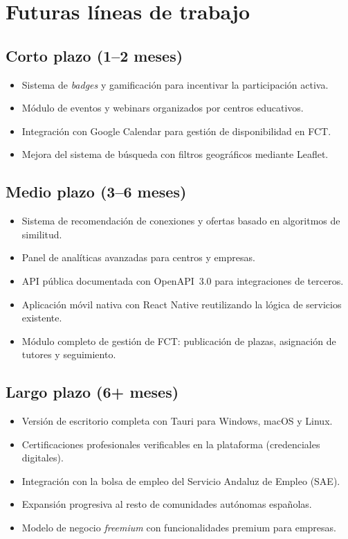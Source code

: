 \documentclass[a4paper]{report}
\begin{document}
\section{Futuras líneas de trabajo}

\subsection{Corto plazo (1--2 meses)}
\begin{itemize}
  \item Sistema de \textit{badges} y gamificación para incentivar la participación activa.
  \item Módulo de eventos y webinars organizados por centros educativos.
  \item Integración con Google Calendar para gestión de disponibilidad en FCT.
  \item Mejora del sistema de búsqueda con filtros geográficos mediante Leaflet.
\end{itemize}

\subsection{Medio plazo (3--6 meses)}
\begin{itemize}
  \item Sistema de recomendación de conexiones y ofertas basado en algoritmos de similitud.
  \item Panel de analíticas avanzadas para centros y empresas.
  \item API pública documentada con OpenAPI~3.0 para integraciones de terceros.
  \item Aplicación móvil nativa con React Native reutilizando la lógica de servicios existente.
  \item Módulo completo de gestión de FCT: publicación de plazas, asignación de tutores y seguimiento.
\end{itemize}

\subsection{Largo plazo (6+ meses)}
\begin{itemize}
  \item Versión de escritorio completa con Tauri para Windows, macOS y Linux.
  \item Certificaciones profesionales verificables en la plataforma (credenciales digitales).
  \item Integración con la bolsa de empleo del Servicio Andaluz de Empleo (SAE).
  \item Expansión progresiva al resto de comunidades autónomas españolas.
  \item Modelo de negocio \textit{freemium} con funcionalidades premium para empresas.
\end{itemize}
\end{document}
